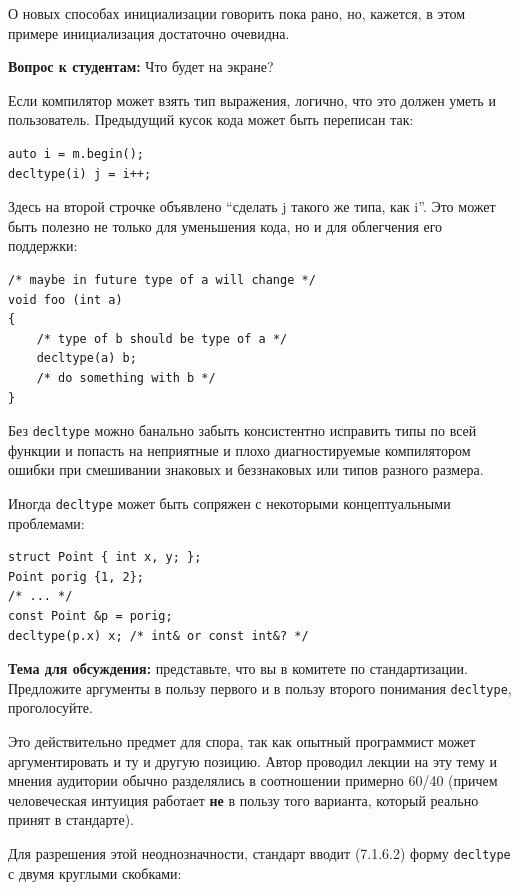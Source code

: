 \documentclass[a4paper,12pt,oneside]{article}
\newif\ifanswers
\begin{document}
О новых способах инициализации говорить пока рано, но, кажется, в этом примере инициализация достаточно очевидна.

\textbf{Вопрос к студентам:} Что будет на экране?

\ifanswers
Правильный ответ: внезапно на экране будет Hello World.
\fi

Если компилятор может взять тип выражения, логично, что это должен уметь и пользователь. Предыдущий кусок кода может быть переписан так:

\begin{lstlisting}
auto i = m.begin(); 
decltype(i) j = i++;
\end{lstlisting}

Здесь на второй строчке объявлено ``сделать j такого же типа, как i''. Это может быть полезно не только для уменьшения кода, но и для облегчения его поддержки:

\begin{lstlisting}
/* maybe in future type of a will change */
void foo (int a)
{
    /* type of b should be type of a */
    decltype(a) b;
    /* do something with b */
}
\end{lstlisting}

Без \lstinline!decltype! можно банально забыть консистентно исправить типы по всей функции и попасть на неприятные и плохо диагностируемые компилятором ошибки при смешивании знаковых и беззнаковых или типов разного размера.

Иногда \lstinline!decltype! может быть сопряжен с некоторыми концептуальными проблемами:

\begin{lstlisting}
struct Point { int x, y; };
Point porig {1, 2};
/* ... */
const Point &p = porig;
decltype(p.x) x; /* int& or const int&? */
\end{lstlisting}

\textbf{Тема для обсуждения:} представьте, что вы в комитете по стандартизации. Предложите аргументы в пользу первого и в пользу второго понимания \lstinline!decltype!, проголосуйте.

Это действительно предмет для спора, так как опытный программист может аргументировать и ту и другую позицию. Автор проводил лекции на эту тему и мнения аудитории обычно разделялись в соотношении примерно 60/40 (причем человеческая интуиция работает \textbf{не} в пользу того варианта, который реально принят в стандарте).

Для разрешения этой неоднозначности, стандарт вводит (7.1.6.2) форму \lstinline!decltype! с двумя круглыми скобками:
\end{document}
